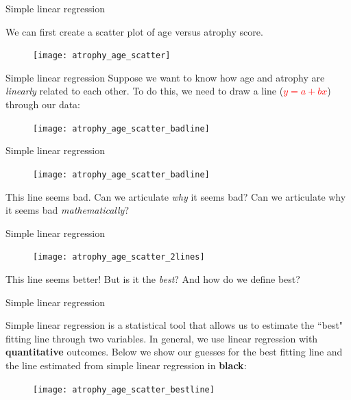 \documentclass[10pt,t]{beamer}
\begin{document}
\begin{frame}{Simple linear regression}

We can first create a scatter plot of age versus atrophy score.

\vspace{0.3cm}

\begin{figure}
	\centering \texttt{[image: atrophy\_age\_scatter]}
\end{figure}

\end{frame}

\begin{frame}{Simple linear regression}
Suppose we want to know how age and atrophy are \textit{linearly} related to each other. To do this, we need to draw a line (\textcolor{red}{$y = a + bx$}) through our data:

\vspace{0.3cm}
\begin{figure}
\centering \texttt{[image: atrophy\_age\_scatter\_badline]}
\end{figure}

\end{frame}

\begin{frame}{Simple linear regression}


\begin{figure}
	\centering \texttt{[image: atrophy\_age\_scatter\_badline]}
\end{figure}

\vspace{0.3cm}

This line seems bad. Can we articulate \textit{why} it seems bad? Can we articulate why it seems bad \textit{mathematically}?

\end{frame}

\begin{frame}{Simple linear regression}

\begin{figure}
	\centering \texttt{[image: atrophy\_age\_scatter\_2lines]}
\end{figure}

\vspace{0.3cm}
\small This line seems better! But is it the \textit{best}? And how do we define best?

\end{frame}

\begin{frame}{Simple linear regression}
	
	
	
Simple linear regression is a statistical tool that allows us to estimate the ``best" fitting line through two variables. In general, we use linear regression with \textbf{quantitative} outcomes. Below we show our guesses for the best fitting line and the line estimated from simple linear regression in \textbf{black}:

\begin{figure}
	\centering \texttt{[image: atrophy\_age\_scatter\_bestline]}
\end{figure}

\end{frame}
\end{document}
